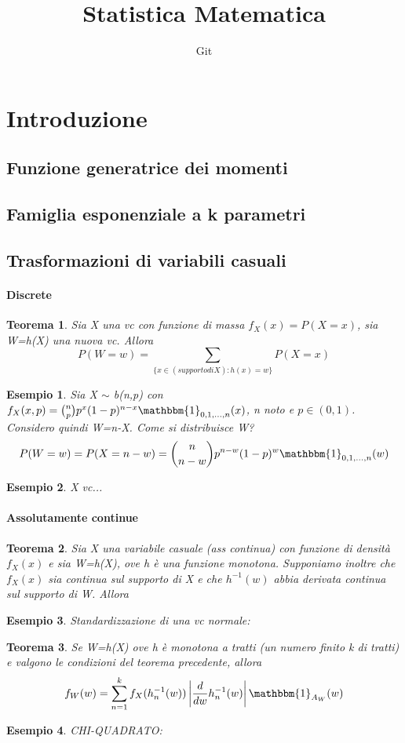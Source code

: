 \documentclass[12pt]{article}
\title{Statistica Matematica}
\author{Git}
\date{}
\newtheorem{esempio}{Esempio}
\newtheorem{teorema}{Teorema}
\begin{document}
\maketitle


\section{Introduzione}
\subsection{Funzione generatrice dei momenti}
\subsection{Famiglia esponenziale a k parametri}
\subsection{Trasformazioni di variabili casuali}
\paragraph{Discrete}
\begin{teorema}
Sia X una vc con funzione di massa $f_X(x)=P(X=x)$,  sia W=h(X) una nuova vc. Allora $$
P(W=w)=\sum_{\{x\in (supporto di X):h(x)=w\}}P(X=x)$$
\end{teorema}
\begin{esempio}
Sia X $\sim$ b(n,p) con $f_X(x,p)=\binom{n}{p}p^x(1-p)^{n-x}\mathbbm{1}_{0,1,...,n}(x)$, n noto e $p\in(0,1)$.
Considero quindi W=n-X. Come si distribuisce W? 
$$P(W=w)=P(X=n-w)=\binom{n}{n-w}p^{n-w}(1-p)^w\mathbbm{1}_{0,1,...,n}(w)$$
\end{esempio}
\begin{esempio}
X vc...
\end{esempio}
\paragraph{Assolutamente continue}

\begin{teorema}
Sia X una variabile casuale (ass continua) con funzione di densità $f_X(x)$ e sia W=h(X), ove h è una funzione monotona. 
Supponiamo inoltre che $f_X(x)$ sia continua sul supporto di X e che $h^{-1}(w)$ abbia derivata continua sul supporto di W. Allora
\end{teorema}
\begin{esempio}
Standardizzazione di una vc normale:
\end{esempio}
\begin{teorema}
Se W=h(X) ove h è monotona a tratti (un numero finito k di tratti) e valgono le condizioni del teorema precedente, allora
$$f_W(w)=\sum_{n=1}^k f_X(h_n^{-1}(w))\left|\frac{d}{dw}h_n^{-1}(w)\right|\mathbbm{1}_{A_W}(w)$$
\end{teorema}
\begin{esempio}
CHI-QUADRATO:
\end{esempio}
\end{document}
